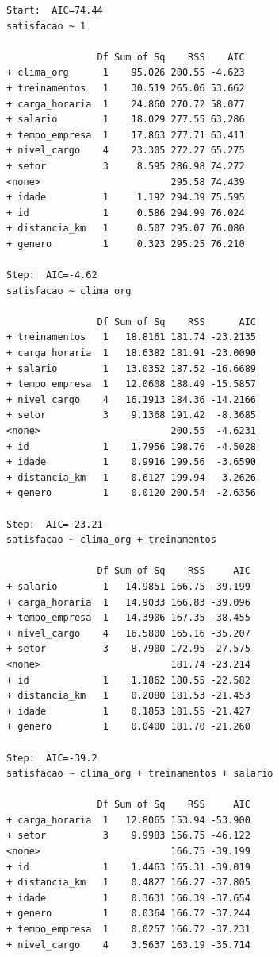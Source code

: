 \documentclass[
  letterpaper,
  DIV=11,
  numbers=noendperiod]{scrartcl}
\begin{document}
\begin{verbatim}
Start:  AIC=74.44
satisfacao ~ 1

                Df Sum of Sq    RSS    AIC
+ clima_org      1    95.026 200.55 -4.623
+ treinamentos   1    30.519 265.06 53.662
+ carga_horaria  1    24.860 270.72 58.077
+ salario        1    18.029 277.55 63.286
+ tempo_empresa  1    17.863 277.71 63.411
+ nivel_cargo    4    23.305 272.27 65.275
+ setor          3     8.595 286.98 74.272
<none>                       295.58 74.439
+ idade          1     1.192 294.39 75.595
+ id             1     0.586 294.99 76.024
+ distancia_km   1     0.507 295.07 76.080
+ genero         1     0.323 295.25 76.210

Step:  AIC=-4.62
satisfacao ~ clima_org

                Df Sum of Sq    RSS      AIC
+ treinamentos   1   18.8161 181.74 -23.2135
+ carga_horaria  1   18.6382 181.91 -23.0090
+ salario        1   13.0352 187.52 -16.6689
+ tempo_empresa  1   12.0608 188.49 -15.5857
+ nivel_cargo    4   16.1913 184.36 -14.2166
+ setor          3    9.1368 191.42  -8.3685
<none>                       200.55  -4.6231
+ id             1    1.7956 198.76  -4.5028
+ idade          1    0.9916 199.56  -3.6590
+ distancia_km   1    0.6127 199.94  -3.2626
+ genero         1    0.0120 200.54  -2.6356

Step:  AIC=-23.21
satisfacao ~ clima_org + treinamentos

                Df Sum of Sq    RSS     AIC
+ salario        1   14.9851 166.75 -39.199
+ carga_horaria  1   14.9033 166.83 -39.096
+ tempo_empresa  1   14.3906 167.35 -38.455
+ nivel_cargo    4   16.5800 165.16 -35.207
+ setor          3    8.7900 172.95 -27.575
<none>                       181.74 -23.214
+ id             1    1.1862 180.55 -22.582
+ distancia_km   1    0.2080 181.53 -21.453
+ idade          1    0.1853 181.55 -21.427
+ genero         1    0.0400 181.70 -21.260

Step:  AIC=-39.2
satisfacao ~ clima_org + treinamentos + salario

                Df Sum of Sq    RSS     AIC
+ carga_horaria  1   12.8065 153.94 -53.900
+ setor          3    9.9983 156.75 -46.122
<none>                       166.75 -39.199
+ id             1    1.4463 165.31 -39.019
+ distancia_km   1    0.4827 166.27 -37.805
+ idade          1    0.3631 166.39 -37.654
+ genero         1    0.0364 166.72 -37.244
+ tempo_empresa  1    0.0257 166.72 -37.231
+ nivel_cargo    4    3.5637 163.19 -35.714


\end{verbatim}
\end{document}

